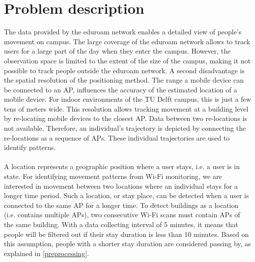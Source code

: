\section{Problem description}
The data provided by the eduroam network enables a detailed view of people's movement on campus. The large coverage of the eduroam network allows to track users for a large part of the day when they enter the campus. However, the observation space is limited to the extent of the size of the campus, making it not possible to track people outside the eduroam network. A second disadvantage is the spatial resolution of the positioning method. The range a mobile device can be connected to an AP,  influences the accuracy of the estimated location of a mobile device. For indoor environments of the TU Delft campus, this is just a few tens of meters wide. This resolution allows tracking movement at a building level by re-locating mobile devices to the closest AP. Data between two re-locations is not available. Therefore, an individual's trajectory is depicted by connecting the re-locations as a sequence of APs. These individual trajectories are used to identify patterns. \\\\
A location represents a geographic position where a user stays, i.e. a user is in state. For identifying movement patterns from Wi-Fi monitoring, we are interested in movement between two locations where an individual stays for a longer time period. Such a location, or stay place, can be detected when a user is connected to the same AP for a longer time. To detect  buildings as a location (i.e. contains multiple APs), two consecutive Wi-Fi scans must contain  APs of the same building. With a data collecting interval of 5 minutes, it means that people will be filtered out if their stay duration is less than 10 minutes. Based on this assumption, people with a shorter stay duration are considered passing by, as explained in \autoref{preprocessing}.

